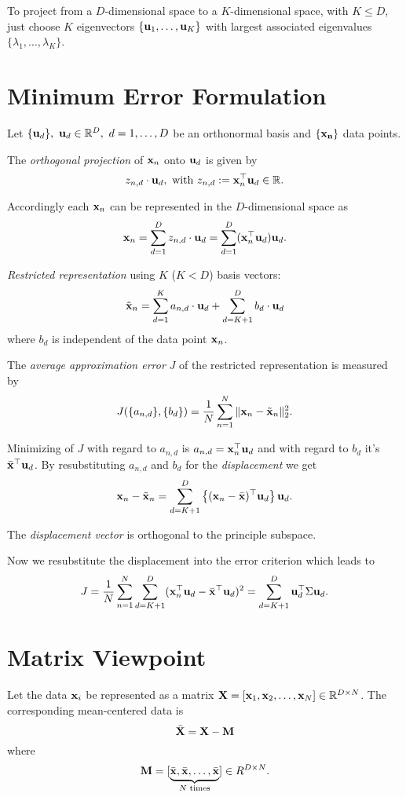 To project from a \(D\)-dimensional space to a \(K\)-dimensional space, with \(K \leq D\), just choose \(K\) eigenvectors \(\{\mathbf{u}_1, \ldots, \mathbf{u}_K\}\) with largest associated eigenvalues \(\{\lambda_1, \ldots, \lambda_K\}\).

\section{Minimum Error Formulation}
Let \(\{\matr{u}_d\},\ \matr{u}_d \in \R^D,\ d = 1, \ldots, D\) be an orthonormal basis and \(\{\mathbf{x_n}\}\) data points.

The \textit{orthogonal projection} of \(\mathbf{x}_n\) onto \(\mathbf{u}_d\) is given by \[
z_{n,d} \cdot \mathbf{u}_d, \text{ with } z_{n,d} := \mathbf{x}_n^\top \mathbf{u}_d \in \mathbb{R}.
\]

Accordingly each \(\mathbf{x}_n\) can be represented in the \(D\)-dimensional space as \[
\mathbf{x}_n = \sum_{d=1}^D z_{n,d} \cdot \mathbf{u}_d = \sum_{d=1}^D (\mathbf{x}_n^\top \mathbf{u}_d) \mathbf{u}_d.
\]

\textit{Restricted representation} using \(K\) (\(K < D\)) basis vectors: \[
\tilde{\mathbf{x}}_n = \sum_{d=1}^K a_{n, d} \cdot \mathbf{u}_d + \sum_{d=K+1}^D b_d \cdot \mathbf{u}_d
\]
where \(b_d\) is independent of the data point \(\mathbf{x}_n\).

The \textit{average approximation error} \(J\) of the restricted representation is measured by \[
J(\{a_{n,d}\}, \{b_d\}) = \frac{1}{N} \sum_{n=1}^N \|\mathbf{x}_n - \tilde{\mathbf{x}}_n\|_2^2.
\]

Minimizing of \(J\) with regard to \(a_{n,d}\) is \(a_{n,d} = \mathbf{x}_n^\top \mathbf{u}_d\) and with regard to \(b_d\) it's \(\bar{\mathbf{x}}^\top \mathbf{u}_d\). By resubstituting \(a_{n,d}\) and \(b_d\) for the \textit{displacement} we get \[
\mathbf{x}_n - \tilde{\mathbf{x}}_n = \sum_{d=K+1}^D \left\lbrace (\mathbf{x}_n - \bar{\mathbf{x}})^\top \mathbf{u}_d \right\rbrace \mathbf{u}_d.
\]

The \textit{displacement vector} is orthogonal to the principle subspace.

Now we resubstitute the displacement into the error criterion which leads to \[
J = \frac{1}{N}\sum_{n=1}^N \sum_{d=K+1}^D (\mathbf{x}_n^\top \mathbf{u}_d - \bar{\mathbf{x}}^\top \mathbf{u}_d)^2 = \sum_{d=K+1}^D \mathbf{u}_d^\top \Sigma \mathbf{u}_d.
\]


\section{Matrix Viewpoint}
Let the data \(\mathbf{x}_i\) be represented as a matrix \(\mathbf{X} = [\mathbf{x}_1, \mathbf{x}_2, \ldots, \mathbf{x}_N] \in \mathbb{R}^{D \times N}\). The corresponding mean-centered data is \[\bar{\mathbf{X}} = \mathbf{X} - \mathbf{M}\] where \[\matr{M} = [\underbrace{\bar{\matr{x}}, \bar{\matr{x}}, \ldots, \bar{\matr{x}}}_{\mathclap{N \text{ times}}}] \in R^{D \times N}.\]

